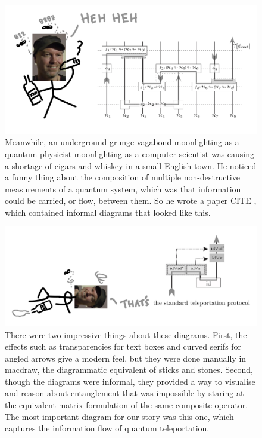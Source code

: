 \begin{figure}[h!]
\includegraphics{figures/cartoons/bob1}
\caption{Meanwhile, an underground grunge vagabond moonlighting as a quantum physicist moonlighting as a computer scientist was causing a shortage of cigars and whiskey in a small English town. He noticed a funny thing about the composition of multiple non-destructive measurements of a quantum system, which was that information could be carried, or flow, between them. So he wrote a paper \bR CITE \e, which contained informal diagrams that looked like this.}
\end{figure}

\begin{figure}[h!]
\includegraphics{figures/cartoons/bob2}
\caption{There were two impressive things about these diagrams. First, the effects such as transparencies for text boxes and curved serifs for angled arrows give a modern feel, but they were done manually in macdraw, the diagrammatic equivalent of sticks and stones. Second, though the diagrams were informal, they provided a way to visualise and reason about entanglement that was impossible by staring at the equivalent matrix formulation of the same composite operator. The most important diagram for our story was this one, which captures the information flow of quantum teleportation.}
\end{figure}
\clearpage

